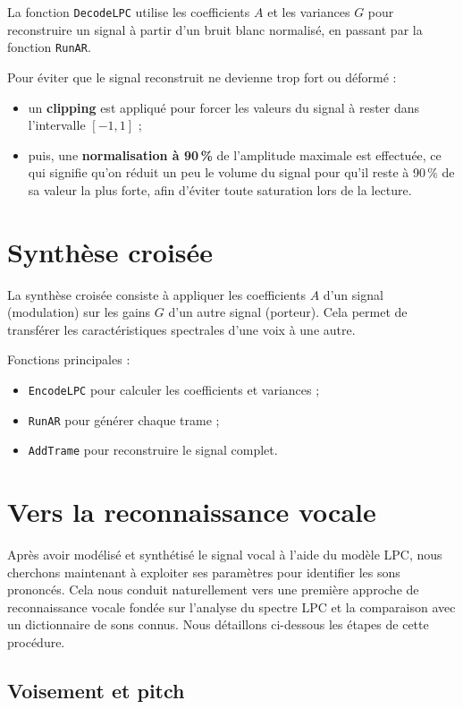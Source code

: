 \documentclass[11pt]{article}
\begin{document}
La fonction \texttt{DecodeLPC} utilise les coefficients $A$ et les variances $G$ pour reconstruire un signal à partir d'un bruit blanc normalisé, en passant par la fonction \texttt{RunAR}. 

Pour éviter que le signal reconstruit ne devienne trop fort ou déformé :
\begin{itemize}
  \item un \textbf{clipping} est appliqué pour forcer les valeurs du signal à rester dans l’intervalle $[-1, 1]$ ;
  \item puis, une \textbf{normalisation à 90\,\%} de l’amplitude maximale est effectuée, ce qui signifie qu’on réduit un peu le volume du signal pour qu’il reste à 90\,\% de sa valeur la plus forte, afin d’éviter toute saturation lors de la lecture.
\end{itemize}

\section{Synthèse croisée}

La synthèse croisée consiste à appliquer les coefficients \( A \) d’un signal (modulation) sur les gains \( G \) d’un autre signal (porteur). Cela permet de transférer les caractéristiques spectrales d’une voix à une autre.

Fonctions principales :
\begin{itemize}
    \item \texttt{EncodeLPC} pour calculer les coefficients et variances ;
    \item \texttt{RunAR} pour générer chaque trame ;
    \item \texttt{AddTrame} pour reconstruire le signal complet.
\end{itemize}

\section{Vers la reconnaissance vocale}

Après avoir modélisé et synthétisé le signal vocal à l’aide du modèle LPC, nous cherchons maintenant à exploiter ses paramètres pour identifier les sons prononcés. Cela nous conduit naturellement vers une première approche de reconnaissance vocale fondée sur l’analyse du spectre LPC et la comparaison avec un dictionnaire de sons connus.  Nous détaillons ci-dessous les étapes de cette procédure.

\subsection{Voisement et pitch}
\end{document}
